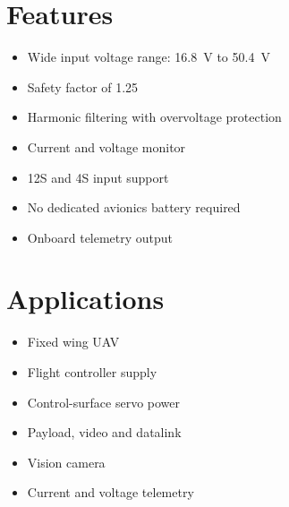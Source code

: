 \documentclass[a4paper,12pt,oneside,final]{article}
\begin{document}
\noindent
\begin{minipage}[t]{0.44\textwidth}
  \vspace{0pt}
  \section{Features}
  \begin{itemize}[label=--, itemsep=6pt, topsep=4pt, parsep=0pt, leftmargin=*]
    \item Wide input voltage range: \SI{16.8}{\volt} to \SI{50.4}{\volt}
    \item Safety factor of 1.25
    \item Harmonic filtering with overvoltage protection
    \item Current and voltage monitor
    \item 12S and 4S input support
    \item No dedicated avionics battery required
    \item Onboard telemetry output
  \end{itemize}

  \section{Applications}
  \begin{itemize}[label=--, itemsep=6pt, topsep=4pt, parsep=0pt, leftmargin=*]
    \item Fixed wing UAV
    \item Flight controller supply
    \item Control-surface servo power
    \item Payload, video and datalink
    \item Vision camera
    \item Current and voltage telemetry
  \end{itemize}
\end{minipage}%
\hfill
\end{document}
